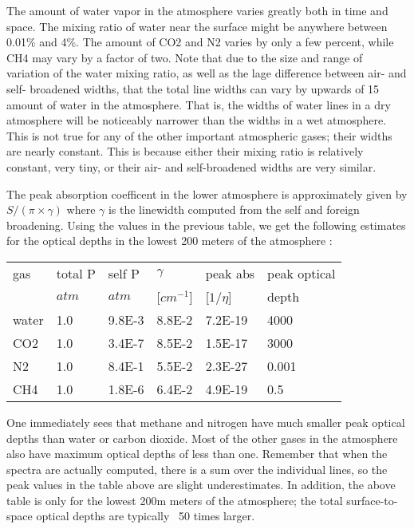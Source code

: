 \documentclass[11pt]{article}
\begin{document}
The amount of water vapor in the atmosphere varies greatly both in
time and space.  The mixing ratio of water near the surface might be
anywhere between 0.01\% and 4\%.  The amount of CO2 and N2 varies by only
a few percent, while CH4 may vary by a factor of two.  Note that due
to the size and range of variation of the water mixing ratio, as well
as the lage difference between air- and self- broadened widths, that
the total line widths can vary by upwards of 15%
amount of water in the atmosphere.  That is, the widths of water
lines in a dry atmosphere will be noticeably narrower than the widths
in a wet atmosphere.  This is not true for any of the other important
atmospheric gases; their widths are nearly constant.  This is because
either their mixing ratio is relatively constant, very tiny, or their
air- and self-broadened widths are very similar.

The peak absorption coefficent in the lower atmosphere is approximately
given by $S/(\pi \times \gamma)$ 
where $\gamma$ is the linewidth computed from the self and foreign 
broadening.  Using the values in the previous table, we get the following
estimates for the optical depths in the lowest 200 meters of the atmosphere : 

\begin{longtable}{llllll} 
\hline
\hline
gas & total P & self P & $\gamma$   & peak abs   & peak optical \\
    & $atm$   & $atm$  & [$cm^{-1}$] & [$1/\eta$] & depth \\
\hline
\hline
water & 1.0 & 9.8E-3 & 8.8E-2 & 7.2E-19 & 4000 \\
CO2   & 1.0 & 3.4E-7 & 8.5E-2 & 1.5E-17 & 3000 \\
N2    & 1.0 & 8.4E-1 & 5.5E-2 & 2.3E-27 & 0.001\\
CH4   & 1.0 & 1.8E-6 & 6.4E-2 & 4.9E-19 & 0.5\\
\hline
\hline 
\end{longtable} 

One immediately sees that methane and nitrogen have much smaller peak
optical depths than water or carbon dioxide.  Most of the other gases
in the atmosphere also have maximum optical depths of less than one.
Remember that when the spectra are actually computed, there is a sum over 
the individual lines, so the peak values in the table above are slight 
underestimates. In addition, the above table is only for the lowest 200m
meters of the atmosphere; the total surface-to-space optical depths
are typically ~50 times larger.
\end{document}
